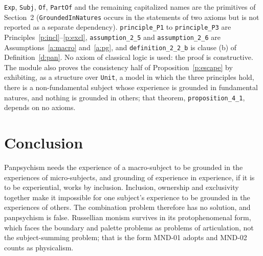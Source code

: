 \documentclass{situationist-preprint}
\begin{document}
\texttt{Exp}, \texttt{Subj}, \texttt{Of}, \texttt{PartOf} and the remaining capitalized names are the primitives of Section~2 (\texttt{GroundedInNatures} occurs in the statements of two axioms but is not reported as a separate dependency). \texttt{principle\_P1} to \texttt{principle\_P3} are Principles~\ref{p:incl}--\ref{p:excl}, \texttt{assumption\_2\_5} and \texttt{assumption\_2\_6} are Assumptions~\ref{a:macro} and~\ref{a:pg}, and \texttt{definition\_2\_2\_b} is clause (b) of Definition~\ref{d:pan}. No axiom of classical logic is used: the proof is constructive. The module also proves the consistency half of Proposition~\ref{p:escape} by exhibiting, as a structure over \texttt{Unit}, a model in which the three principles hold, there is a non-fundamental subject whose experience is grounded in fundamental natures, and nothing is grounded in others; that theorem, \texttt{proposition\_4\_1}, depends on no axioms.

\section{Conclusion}

Panpsychism needs the experience of a macro-subject to be grounded in the experiences of micro-subjects, and grounding of experience in experience, if it is to be experiential, works by inclusion. Inclusion, ownership and exclusivity together make it impossible for one subject's experience to be grounded in the experiences of others. The combination problem therefore has no solution, and panpsychism is false. Russellian monism survives in its protophenomenal form, which faces the boundary and palette problems as problems of articulation, not the subject-summing problem; that is the form MND-01 adopts and MND-02 counts as physicalism.
\end{document}
